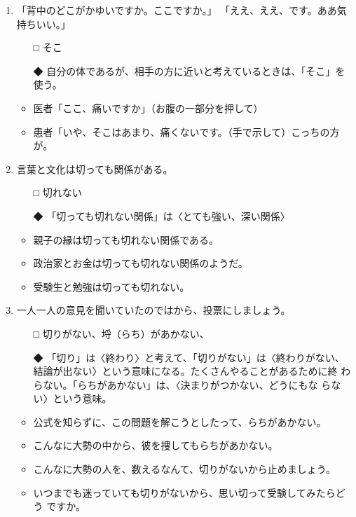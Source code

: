 \documentclass[
uplatex,
b5paper,
10pt,
dvipdfmx
]{jsbook}
\begin{document}
\begin{enumerate}
\item 「背中のどこがかゆいですか。ここですか。」
   「ええ、ええ、\underline{\hspace{3zw}}です。ああ気持ちいい。」

\begin{itemize}
\item[□] そこ
\item[◆] 自分の体であるが、相手の方に近いと考えているときは、「そこ」を使う。
\end{itemize}

\begin{itemize}
 \item 医者「ここ、痛いですか」（お腹の一部分を押して）
 \item 患者「いや、そこはあまり、痛くないです。（手で示して）こっちの方が。
\end{itemize}

\item 言葉と文化は切っても\underline{\hspace{3zw}}関係がある。
      
\begin{itemize}
\item[□] 切れない
\item[◆] 「切っても切れない関係」は〈とても強い、深い関係〉
\end{itemize}
\begin{itemize}
 \item 親子の縁は切っても切れない関係である。
 \item 政治家とお金は切っても切れない関係のようだ。
 \item 受験生と勉強は切っても切れない。
\end{itemize}

\item 一人一人の意見を聞いていたのでは\underline{\hspace{3zw}}から、投票にしましょう。

\begin{itemize}
\item[□] 切りがない、埒（らち）があかない、
\item[◆] 「切り」は〈終わり〉と考えて、「切りがない」は〈終わりがない、
	  結論が出ない〉という意味になる。たくさんやることがあるために終
	  わらない。「らちがあかない」は、〈決まりがつかない、どうにもな
	  らない〉という意味。
\end{itemize}
\begin{itemize}
\item 公式を知らずに、この問題を解こうとしたって、らちがあかない。
\item こんなに大勢の中から、彼を捜してもらちがあかない。
\item こんなに大勢の人を、数えるなんて、切りがないから止めましょう。
\item いつまでも迷っていても切りがないから、思い切って受験してみたらどう
      ですか。
\end{itemize}


\end{enumerate}
\end{document}

